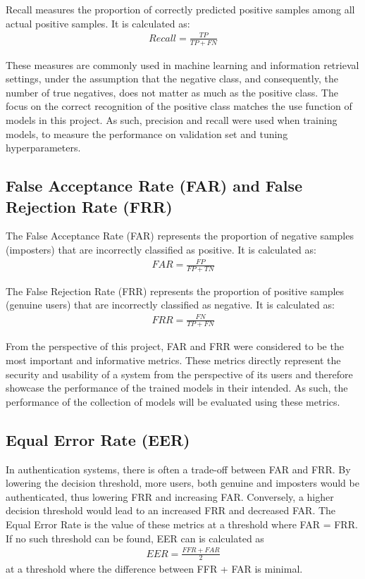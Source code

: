 Recall measures the proportion of correctly predicted positive samples among all actual positive samples. It is calculated as:
\begin{align}
Recall = \frac{TP}{TP + FN}
\end{align}

These measures are commonly used in machine learning and information retrieval settings, under the assumption that the negative class, and consequently, the number of true negatives, does not matter as much as the positive class. The focus on the correct recognition of the positive class matches the use function of models in this project.
As such, precision and recall were used when training models, to measure the performance on validation set and tuning hyperparameters.

\subsection{False Acceptance Rate (FAR) and False Rejection Rate (FRR)} \label{FAR_FRR_theory}
The False Acceptance Rate (FAR) represents the proportion of negative samples (imposters) that are incorrectly classified as positive. It is calculated as:
\begin{align}
FAR = \frac{FP}{FP + TN}
\end{align}

The False Rejection Rate (FRR) represents the proportion of positive samples (genuine users) that are incorrectly classified as negative. It is calculated as:
\begin{align}
FRR = \frac{FN}{TP + FN}
\end{align}

From the perspective of this project, FAR and FRR were considered to be the most important and informative metrics. These metrics directly represent the security and usability of a system from the perspective of its users and therefore showcase the performance of the trained models in their intended. As such, the performance of the collection of models will be evaluated using these metrics. 

\subsection{Equal Error Rate (EER)}
In authentication systems, there is often a trade-off between FAR and FRR. By lowering the decision threshold, more users, both genuine and imposters would be authenticated, thus lowering FRR and increasing FAR. Conversely, a higher decision threshold would lead to an increased FRR and decreased FAR.
The Equal Error Rate is the value of these metrics at a threshold where FAR = FRR. If no such threshold can be found, EER can is calculated as  
\begin{align}
EER = \frac{FFR + FAR}{2}
\end{align}
at a threshold where the difference between FFR + FAR is minimal.

